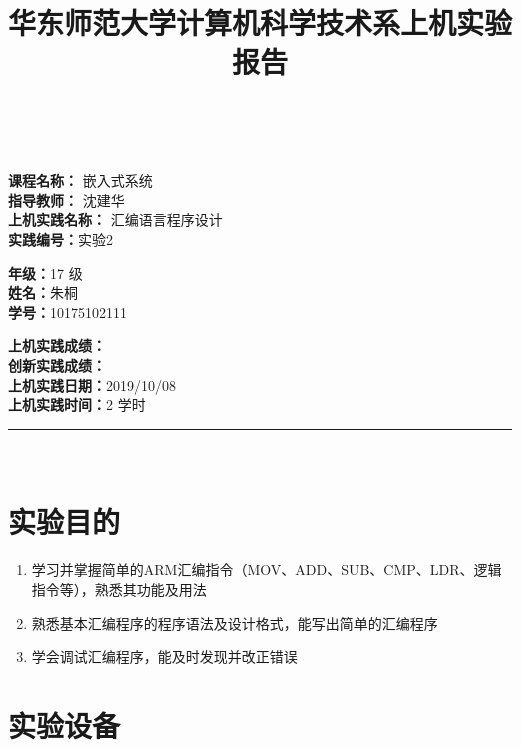 \documentclass[a4paper,10pt,UTF8]{paper}
\title{华东师范大学计算机科学技术系上机实验报告}
\numberwithin{equation}{section}
\numberwithin{figure}{section}
\begin{document}
\pagestyle{fancy}
\lhead{}
\rhead{}
\makeatletter
\def\headrule{{\if@fancyplain\let\headrulewidth\plainheadrulewidth\fi%
\color{gray}\hrule\@height 0.2pt\@width\headwidth}
  \vspace{6mm}}
\makeatother

\newcommand{\HRule}{\rule{\linewidth}{1mm}}
\newcommand{\dai}{\textbf{Dais-CMX16$^+$}}

{ \\ [0.8cm]

\small{
  \begin{minipage}[t]{.32\linewidth}
    \textbf{课程名称：} 嵌入式系统\\
    \textbf{指导教师：} 沈建华\\
    \textbf{上机实践名称：} 汇编语言程序设计\\
    \textbf{实践编号：}实验2
  \end{minipage}
  \begin{minipage}[t]{.32\linewidth}
    \textbf{年级：}17 级\\
    \textbf{姓名：}朱桐\\
    \textbf{学号：}10175102111\\
  \end{minipage} 
  \begin{minipage}[t]{.32\linewidth}
    \textbf{上机实践成绩：} \\
    \textbf{创新实践成绩：} \\
    \textbf{上机实践日期：}2019/10/08\\
    \textbf{上机实践时间：}2 学时\\
  \end{minipage}
}
\HRule \\[0.5cm]
}
\section{实验目的}

\begin{enumerate}
    \item 学习并掌握简单的ARM汇编指令（MOV、ADD、SUB、CMP、LDR、逻辑指令等），熟悉其功能及用法
    \item 熟悉基本汇编程序的程序语法及设计格式，能写出简单的汇编程序
    \item 学会调试汇编程序，能及时发现并改正错误
\end{enumerate}

\section{实验设备}
\end{document}
